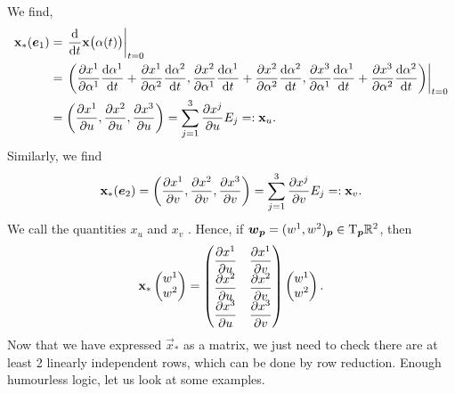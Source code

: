 We find,
\begin{subequations}
  \begin{align}
    \mathbf{x}_{*}(\boldsymbol{e}_{1}) &= \left.\frac{\mathrm{d}}{\mathrm{d} t}\mathbf{x}\bigl(\alpha(t)\bigr)\right|_{t=0}\\
&= \left.\left(\frac{\partial x^{1}}{\partial\alpha^{1}}\frac{\mathrm{d}\alpha^{1}}{\mathrm{d} t} +
\frac{\partial x^{1}}{\partial\alpha^{2}}\frac{\mathrm{d}\alpha^{2}}{\mathrm{d} t},
\frac{\partial x^{2}}{\partial\alpha^{1}}\frac{\mathrm{d}\alpha^{1}}{\mathrm{d} t} +
\frac{\partial x^{2}}{\partial\alpha^{2}}\frac{\mathrm{d}\alpha^{2}}{\mathrm{d} t},
\frac{\partial x^{3}}{\partial\alpha^{1}}\frac{\mathrm{d}\alpha^{1}}{\mathrm{d} t} +
\frac{\partial x^{3}}{\partial\alpha^{2}}\frac{\mathrm{d}\alpha^{2}}{\mathrm{d} t}\right)
\right|_{t=0}\\
&=\left(\frac{\partial x^{1}}{\partial u},
\frac{\partial x^{2}}{\partial u},
\frac{\partial x^{3}}{\partial u}\right)=\sum^{3}_{j=1}\frac{\partial x^{j}}{\partial u}E_{j}=:\mathbf{x}_{u}.
  \end{align}
\end{subequations}
Similarly, we find
\begin{equation}
\mathbf{x}_{*}(\boldsymbol{e}_{2})=\left(\frac{\partial x^{1}}{\partial v},
\frac{\partial x^{2}}{\partial v},
\frac{\partial x^{3}}{\partial v}\right)=\sum^{3}_{j=1}\frac{\partial x^{j}}{\partial v}E_{j}=: \mathbf{x}_{v}.
\end{equation}
We call the quantities $x_{u}$ and $x_{v}$ .
Hence, if
$\boldsymbol{w}_{\boldsymbol{p}}=(w^{1},w^{2})_{\boldsymbol{p}}\in\mathrm{T}_{\boldsymbol{p}}\mathbb{R}^{2}$, then
\begin{equation}
\mathbf{x}_{*}\begin{pmatrix}w^{1}\\w^{2}
\end{pmatrix}=\begin{pmatrix}
\displaystyle\frac{\partial x^{1}}{\partial u} &\displaystyle\frac{\partial x^{1}}{\partial v}\\
\displaystyle\frac{\partial x^{2}}{\partial u} &\displaystyle\frac{\partial x^{2}}{\partial v}\\
\displaystyle\frac{\partial x^{3}}{\partial u} &\displaystyle\frac{\partial x^{3}}{\partial v}
\end{pmatrix}\begin{pmatrix}w^{1}\\w^{2}
\end{pmatrix}.
\end{equation}
Now that we have expressed $\vec{x}_{*}$ as a matrix, we just need to
check there are at least 2 linearly independent rows, which can be done
by row reduction. Enough humourless logic, let us look at some examples.

